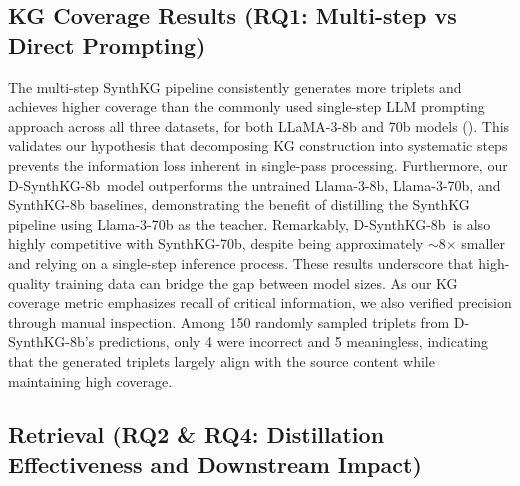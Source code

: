 \documentclass{article} %
\newcommand{\distilledLlama}{\textrm{D-SynthKG-8b}}
\begin{document}
\subsection{KG Coverage Results (RQ1: Multi-step vs Direct Prompting)}
\label{sec:kg-coverage-results}
The multi-step SynthKG pipeline consistently generates more triplets and achieves higher coverage than the commonly used single-step LLM prompting approach across all three datasets, for both LLaMA-3-8b and 70b models (). This validates our hypothesis that decomposing KG construction into systematic steps prevents the information loss inherent in single-pass processing. Furthermore, our \distilledLlama\ model outperforms the untrained Llama-3-8b, Llama-3-70b, and SynthKG-8b baselines, demonstrating the benefit of distilling the SynthKG pipeline using Llama-3-70b as the teacher. Remarkably, \distilledLlama\ is also highly competitive with SynthKG-70b, despite being approximately $\sim$8$\times$ smaller and relying on a single-step inference process. These results underscore that high-quality training data can bridge the gap between model sizes.
As our KG coverage metric emphasizes recall of critical information, we also verified precision through manual inspection. Among 150 randomly sampled triplets from D-SynthKG-8b's predictions, only 4 were incorrect and 5 meaningless, indicating that the generated triplets largely align with the source content while maintaining high coverage.

\subsection{Retrieval (RQ2 \& RQ4: Distillation Effectiveness and Downstream Impact)}
\label{sec:retrieval-results}
\end{document}
